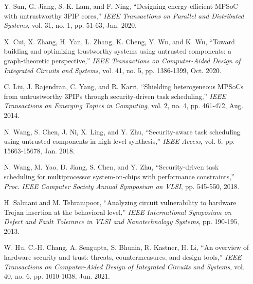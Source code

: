 \documentclass[10pt,journal, compsoc]{IEEEtran}
\begin{document}
\begin{thebibliography}{99}
Y. Sun, G. Jiang, S.-K. Lam, and F. Ning, ``Designing energy-efficient MPSoC with untrustworthy 3PIP cores,'' \textit{IEEE Transactions on Parallel and Distributed Systems}, vol. 31, no. 1, pp. 51-63, Jan. 2020.

X. Cui, X. Zhang, H. Yan, L. Zhang, K. Cheng, Y. Wu, and K. Wu, ``Toward building and optimizing trustworthy systems using untrusted components: a graph-theoretic perspective,'' \textit{IEEE Transactions on Computer-Aided Design of Integrated Circuits and Systems}, vol. 41, no. 5, pp. 1386-1399, Oct. 2020.


C. Liu, J. Rajendran, C. Yang, and R. Karri, ``Shielding heterogeneous MPSoCs from untrustworthy 3PIPs through security-driven task scheduling,'' \textit{IEEE Transactions on Emerging Topics in Computing}, vol. 2, no. 4, pp. 461-472, Aug. 2014.

N. Wang, S. Chen, J. Ni, X. Ling, and Y. Zhu, ``Security-aware task scheduling using untrusted components in high-level synthesis,'' \textit{IEEE Access}, vol. 6, pp. 15663-15678, Jan. 2018.

N. Wang, M. Yao, D. Jiang, S. Chen, and Y. Zhu, ``Security-driven task scheduling for multiprocessor system-on-chips with performance constraints,'' \textit{Proc. IEEE Computer Society Annual Symposium on VLSI}, pp. 545-550, 2018.


H. Salmani and M. Tehranipoor, ``Analyzing circuit vulnerability to hardware Trojan insertion at the behavioral level,'' \textit{IEEE International Symposium on Defect and Fault Tolerance in VLSI and Nanotechnology Systems}, pp. 190-195, 2013.





W. Hu, C.-H. Chang, A. Sengupta, S. Bhunia, R. Kastner, H. Li, ``An overview of hardware security and trust: threats, countermeasures, and design tools,'' \textit{IEEE Transactions on Computer-Aided Design of Integrated Circuits and Systems}, vol. 40, no. 6, pp. 1010-1038, Jun. 2021.









\end{thebibliography}
\end{document}
